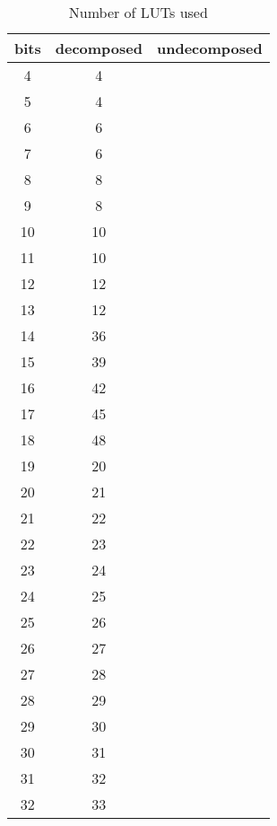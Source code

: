 \documentclass{article}
\begin{document}
\begin{table}[h]
\centering
\begin{tabular}{c | c | c }
bits	 & decomposed	 & undecomposed \\ 
\hline4	 & 4	 &  \\ 
5	 & 4	 &  \\ 
6	 & 6	 &  \\ 
7	 & 6	 &  \\ 
8	 & 8	 &  \\ 
9	 & 8	 &  \\ 
10	 & 10	 &  \\ 
11	 & 10	 &  \\ 
12	 & 12	 &  \\ 
13	 & 12	 &  \\ 
14	 & 36	 &  \\ 
15	 & 39	 &  \\ 
16	 & 42	 &  \\ 
17	 & 45	 &  \\ 
18	 & 48	 &  \\ 
19	 & 20	 &  \\ 
20	 & 21	 &  \\ 
21	 & 22	 &  \\ 
22	 & 23	 &  \\ 
23	 & 24	 &  \\ 
24	 & 25	 &  \\ 
25	 & 26	 &  \\ 
26	 & 27	 &  \\ 
27	 & 28	 &  \\ 
28	 & 29	 &  \\ 
29	 & 30	 &  \\ 
30	 & 31	 &  \\ 
31	 & 32	 &  \\ 
32	 & 33	 &  \\ 
\end{tabular}
\caption{Number of LUTs used}
\end{table}
\end{document}
